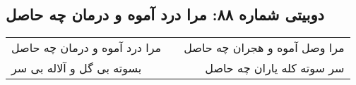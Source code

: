 \begin{center}
\section*{دوبیتی شماره ۸۸: مرا درد آموه و درمان چه حاصل}
\label{sec:088}
\begin{longtable}{l p{0.5cm} r}
مرا درد آموه و درمان چه حاصل
&&
مرا وصل آموه و هجران چه حاصل
\\
بسوته بی گل و آلاله بی سر
&&
سر سوته کله یاران چه حاصل
\\
\end{longtable}
\end{center}
